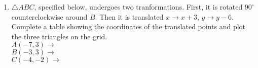 \documentclass[12pt, twoside]{article}
\begin{document}
\begin{enumerate}
\newpage

  \item $\triangle ABC$, specified below, undergoes two tranformations. First, it is rotated $90^\circ$ counterclockwise around $B$. Then it is translated $x \rightarrow x+3$, $y \rightarrow y-6$. Complete a table showing the coordinates of the translated points and plot the three triangles on the grid.\\[1cm]
   \hspace{1cm} $A(-7,3) \rightarrow$\\[1cm]
   \hspace{1cm} $B(-3,3) \rightarrow$\\[1cm]
   \hspace{1cm} $C(-4,-2) \rightarrow$

    \vspace{0.5cm}

      \begin{center} %
      \end{center}

\end{enumerate}

\newpage
\end{document}
